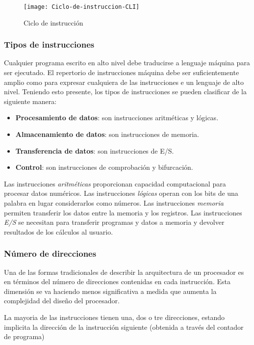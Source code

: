 \begin{subs}
  \begin{figure}[H]
    \centering
    \texttt{[image: Ciclo-de-instruccion-CLI]}
    \caption{Ciclo de instrucción}
  \end{figure}

  \subsubsection{Tipos de instrucciones}

  Cualquier programa escrito en alto nivel debe traducirse a lenguaje máquina para ser ejecutado. El repertorio de instrucciones máquina debe ser suficientemente amplio como para expresar cualquiera de las instrucciones e un lenguaje de alto nivel. Teniendo esto presente, los tipos de instrucciones se pueden clasificar de la siguiente manera:
  \begin{itemize}
    \item \textbf{Procesamiento de datos}: son instrucciones aritméticas y lógicas.
    \item \textbf{Almacenamiento de datos}: son instrucciones de memoria.
    \item \textbf{Transferencia de datos}: son instrucciones de E/S.
    \item \textbf{Control}: son instrucciones de comprobación y bifurcación.
  \end{itemize}

  Las instrucciones \textit{aritméticas} proporcionan capacidad computacional para procesar datos numéricos. Las instrucciones \textit{lógicas} operan con los bits de una palabra en lugar considerarlos como números. Las instrucciones \textit{memoria} permiten transferir los datos entre la memoria y los registros. Las instrucciones \textit{E/S} se necesitan para transferir programas y datos a memoria y devolver resultados de los cálculos al usuario.

  \subsubsection{Número de direcciones}

  Una de las formas tradicionales de describir la arquitectura de un procesador es en términos del número de direcciones contenidas en cada instrucción. Esta dimensión se va haciendo menos significativa a medida que aumenta la complejidad del diseño del procesador.

  La mayoria de las instrucciones tienen una, dos o tre direcciones, estando implicita la dirección de la instrucción siguiente (obtenida a través del contador de programa)


\end{subs}
